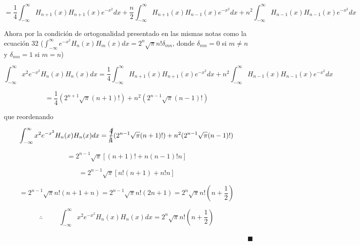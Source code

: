 \documentclass[12pt,a4paper]{article}
\begin{document}
 \begin{equation*}
     =\frac{1}{4}\int_{-\infty}^{\infty}H_{n+1}(x)H_{n+1}(x)e^{-x^2}dx + \frac{n}{2}\int_{-\infty}^{\infty}H_{n+1}(x)H_{n-1}(x)e^{-x^2}dx +n^2\int_{-\infty}^{\infty}H_{n-1}(x)H_{n-1}(x)e^{-x^2}dx
 \end{equation*}

  Ahora por la condición de ortogonalidad presentado en las mismas notas como la ecuación 32 ($\int_{-\infty}^{\infty} e^{-x^2}H_n(x)H_m(x)dx=2^n \sqrt{\pi} n! \delta_{mn}$, donde $\delta_{mn}=0$ si $m\neq n$ y $\delta_{mn}=1$ si $m=n$)
  
  \begin{equation*}
     \int_{-\infty}^{\infty} x^2 e^{-x^2} H_n(x)H_n(x)dx=\frac{1}{4}\int_{-\infty}^{\infty}H_{n+1}(x)H_{n+1}(x)e^{-x^2}dx +n^2\int_{-\infty}^{\infty}H_{n-1}(x)H_{n-1}(x)e^{-x^2}dx
 \end{equation*}
 
 \begin{equation*}
     = \frac{1}{4}(2^{n+1} \sqrt{\pi} (n+1)!)+ n^2(2^{n-1}\sqrt{\pi}(n-1)!)
 \end{equation*}
 
 que reordenando
 
 \begin{equation*}
     \int_{-\infty}^{\infty} x^2 e^{-x^2} H_n(x)H_n(x)dx=\cancel{\frac{4}{4}} (2^{n-1}\sqrt{\pi}(n+1)!)+n^2 (2^{n-1}\sqrt{\pi}(n-1)!)
 \end{equation*}
 
 \begin{equation*}
     = 2^{n-1}\sqrt{\pi}[(n+1)!+n(n-1)!n]
 \end{equation*}
 
 \begin{equation*}
     =2^{n-1}\sqrt{\pi} [n! (n+1)+n! n]
 \end{equation*}
 
 \begin{equation*}
     =2^{n-1}\sqrt{\pi} n! (n+1+n)=2^{n-1}\sqrt{\pi} n! (2n+1) = 2^{n}\sqrt{\pi}n!\left(n+\frac{1}{2}\right)
 \end{equation*}
 
 \begin{equation*}
     \therefore \hspace{1cm} \int_{-\infty}^{\infty} x^2 e^{-x^2} H_n(x)H_n(x)dx=2^{n}\sqrt{\pi}n!\left(n+\frac{1}{2}\right)
 \end{equation*}
 
 $\hspace{15cm} \blacksquare$
\end{document}

